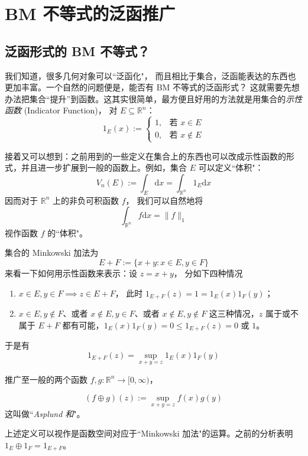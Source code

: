 \chapter{BM 不等式的泛函推广}
\label{chapter:2}

\section{泛函形式的 BM 不等式？}

我们知道，很多几何对象可以``泛函化"， 而且相比于集合，泛函能表达的东西也更加丰富。一个自然的问题便是，能否有 BM 不等式的泛函形式？
这就需要先想办法把集合“提升”到函数。这其实很简单，最方便且好用的方法就是用集合的\emph{示性函数} (Indicator Function)， 对 $E\subseteq\mathbb{R}^n$：
\[
1_E(x):=
\begin{cases}
1, & \text{若 } x\in E\\
0, & \text{若 } x\notin E
\end{cases}
\]

接着又可以想到：之前用到的一些定义在集合上的东西也可以改成示性函数的形式，并且进一步扩展到一般的函数上。例如，集合 $E$ 可以定义``体积"：
\[
V_n(E):=\int_E\mathrm{d}x=\int_{\mathbb{R}^n}1_E\mathrm{d}x
\]
因而对于 $\mathbb{R}^n$ 上的非负可积函数 $f$， 我们可以自然地将
\[
\int_{\mathbb{R}^n}f\mathrm{d}x=\|f\|_1
\]
视作函数 $f$ 的``体积"。

集合的 Minkowski 加法为
\[
E+F:=\{x+y:x\in E,y\in F\}
\]
来看一下如何用示性函数来表示：设 $z=x+y$， 分如下四种情况

\begin{enumerate}
\item $x\in E,y\in F\implies z\in E+F$， 此时 $1_{E+F}(z)=1=1_E(x)1_F(y)$；
\item $x\in E,y\notin F$、或者 $x\notin E,y\in F$、或者 $x\notin E,y\notin F$ 这三种情况，$z$ 属于或不属于 $E+F$ 都有可能，$1_E(x)1_F(y)=0\le 1_{E+F}(z)=\text{0 或 1}$。
\end{enumerate}

于是有
\[
1_{E+F}(z)=\sup_{x+y=z} 1_E(x)1_F(y)
\]

推广至一般的两个函数 $f,g:\mathbb{R}^n\to[0,\infty)$，
\begin{definition}
\[
(f\oplus g)(z):=\sup_{x+y=z}f(x)g(y)
\]
这叫做``\emph{Asplund 和}"。
\end{definition}
上述定义可以视作是函数空间对应于``Minkowski 加法"的运算。之前的分析表明 $1_E\oplus 1_F=1_{E+F}$。

